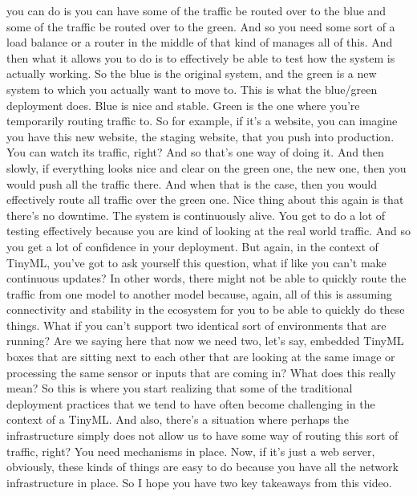 {{{{    you can do is you can have some of the traffic
    be routed over to the blue and some of the traffic
    be routed over to the green.
    And so you need some sort of a load balance or a router
    in the middle of that kind of manages all of this.
    And then what it allows you to do is to effectively
    be able to test how the system is actually working.
    So the blue is the original system, and the green
    is a new system to which you actually want to move to.
    This is what the blue/green deployment does.
    Blue is nice and stable.
    Green is the one where you're temporarily routing traffic to.
    So for example, if it's a website, you can
    imagine you have this new website, the staging
    website, that you push into production.
    You can watch its traffic, right?
    And so that's one way of doing it.
    And then slowly, if everything looks nice and clear
    on the green one, the new one, then you would push all the traffic there.
    And when that is the case, then you would effectively
    route all traffic over the green one.
    Nice thing about this again is that there's no downtime.
    The system is continuously alive.
    You get to do a lot of testing effectively because you are kind
    of looking at the real world traffic.
    And so you get a lot of confidence in your deployment.
    But again, in the context of TinyML, you've
    got to ask yourself this question, what if like
    you can't make continuous updates?
    In other words, there might not be able to quickly route the traffic from one
    model to another model because, again, all of this
    is assuming connectivity and stability in the ecosystem
    for you to be able to quickly do these things.
    What if you can't support two identical sort of environments that are running?
    Are we saying here that now we need two, let's say,
    embedded TinyML boxes that are sitting next to each other that
    are looking at the same image or processing the same sensor
    or inputs that are coming in?
    What does this really mean?
    So this is where you start realizing that some of the traditional deployment
    practices that we tend to have often become
    challenging in the context of a TinyML.
    And also, there's a situation where perhaps the infrastructure simply
    does not allow us to have some way of routing this sort of traffic, right?
    You need mechanisms in place.
    Now, if it's just a web server, obviously, these kinds of things
    are easy to do because you have all the network infrastructure in place.
    So I hope you have two key takeaways from this video.
}}}}
